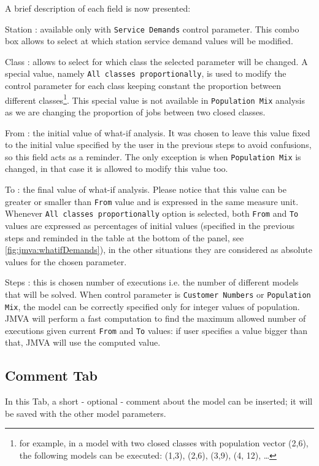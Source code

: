 A brief description of each field is now presented:
\begin{description*}
\item[Station :] available only with \texttt{Service Demands} control
parameter. This combo box allows to select at which station service
demand values will be modified.
\item[Class :] allows to select for which class the selected
parameter will be changed. A special value, namely \texttt{All
classes proportionally}, is used to modify the control parameter for
each class keeping constant the proportion between different
classes\footnote{for example, in a model with two closed classes
with population vector (2,6), the following models can be executed:
(1,3), (2,6), (3,9), (4, 12), \dots}. This special value is not
available in \texttt{Population Mix} analysis as we are changing the
proportion of jobs between two closed classes.
\item[From :] the initial value of what-if analysis. It was chosen
to leave this value fixed to the initial value specified by the user
in the previous steps to avoid confusions, so this field acts as a
reminder. The only exception is when \texttt{Population Mix} is
changed, in that case it is allowed to modify this value too.
\item[To :] the final value of what-if analysis. Please notice that
this value can be greater or smaller than \texttt{From} value and is
expressed in the same measure unit. Whenever \texttt{All classes
proportionally} option is selected, both \texttt{From} and
\texttt{To} values are expressed as percentages of initial values
(specified in the previous steps and reminded in the table at the
bottom of the panel, see \autoref{fig:jmva:whatifDemands}), in the
other situations they are considered as absolute values for the
chosen parameter.
\item[Steps :] this is chosen number of executions i.e. the number
of different models that will be solved. When control parameter is
\texttt{Customer Numbers} or \texttt{Population Mix}, the model can
be correctly specified only for integer values of population. JMVA
will perform a fast computation to find the maximum allowed number
of executions given current \texttt{From} and \texttt{To} values: if
user specifies a value bigger than that, JMVA will use the computed
value.
\end{description*}


\subsection{Comment Tab}
In this Tab, a short - optional - comment about the model can be
inserted; it will be saved with the other model parameters.

